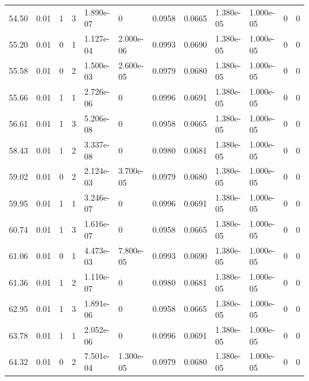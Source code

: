 \documentclass[preview]{standalone}
\begin{document}
{{{\begin{tabular}{L{1.2cm}C{1.2cm} C{0.3cm}C{0.5cm} C{1.4cm}C{1.4cm} C{1.4cm}C{1.4cm} C{1.6cm}C{1.6cm} C{1.6cm}C{1.6cm}}
  54.50  &  0.01  & 1     &  3 &  1.890e-07  & 0  &  0.0958&   0.0665& 1.380e-05 & 1.000e-05   &  0 & 0  \\ 
  55.20  &  0.01  & 0     &  1 &  1.127e-04  & 2.000e-06  &  0.0993&   0.0690& 1.380e-05 & 1.000e-05   &  0 & 0  \\ 
  55.58  &  0.01  & 0     &  2 &  1.500e-03  & 2.600e-05  &  0.0979&   0.0680& 1.380e-05 & 1.000e-05   &  0 & 0  \\ 
  55.66  &  0.01  & 1     &  1 &  2.726e-06  & 0  &  0.0996&   0.0691& 1.380e-05 & 1.000e-05   &  0 & 0  \\ 
  56.61  &  0.01  & 1     &  3 &  5.206e-08  & 0  &  0.0958&   0.0665& 1.380e-05 & 1.000e-05   &  0 & 0  \\ 
  58.43  &  0.01  & 1     &  2 &  3.337e-08  & 0  &  0.0980&   0.0681& 1.380e-05 & 1.000e-05   &  0 & 0  \\ 
  59.02  &  0.01  & 0     &  2 &  2.124e-03  & 3.700e-05  &  0.0979&   0.0680& 1.380e-05 & 1.000e-05   &  0 & 0  \\ 
  59.95  &  0.01  & 1     &  1 &  3.246e-07  & 0  &  0.0996&   0.0691& 1.380e-05 & 1.000e-05   &  0 & 0  \\ 
  60.74  &  0.01  & 1     &  3 &  1.616e-07  & 0  &  0.0958&   0.0665& 1.380e-05 & 1.000e-05   &  0 & 0  \\ 
  61.06  &  0.01  & 0     &  1 &  4.473e-03  & 7.800e-05  &  0.0993&   0.0690& 1.380e-05 & 1.000e-05   &  0 & 0  \\ 
  61.36  &  0.01  & 1     &  2 &  1.110e-07  & 0  &  0.0980&   0.0681& 1.380e-05 & 1.000e-05   &  0 & 0  \\ 
  62.95  &  0.01  & 1     &  3 &  1.891e-06  & 0  &  0.0958&   0.0665& 1.380e-05 & 1.000e-05   &  0 & 0  \\ 
  63.78  &  0.01  & 1     &  1 &  2.052e-06  & 0  &  0.0996&   0.0691& 1.380e-05 & 1.000e-05   &  0 & 0  \\ 
  64.32  &  0.01  & 0     &  2 &  7.501e-04  & 1.300e-05  &  0.0979&   0.0680& 1.380e-05 & 1.000e-05   &  0 & 0  \\ 
\hline 
\end{tabular} 

}}}
\end{document}
